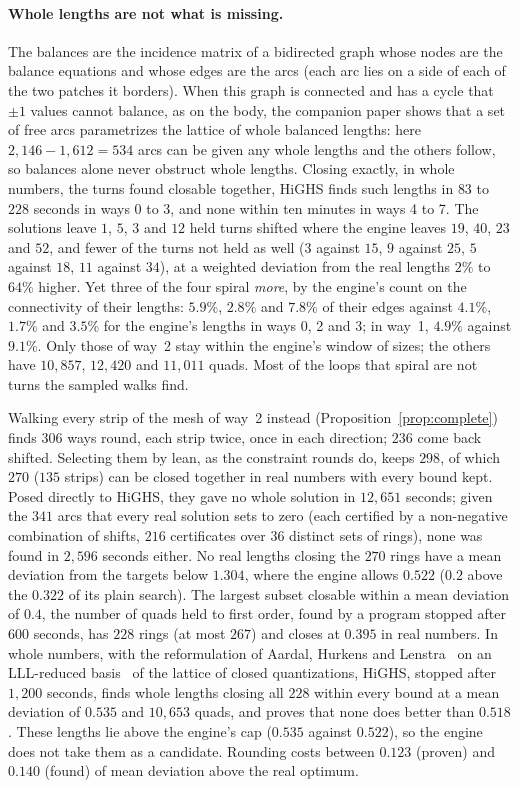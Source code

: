 \documentclass[11pt,a4paper]{article}
\begin{document}
\paragraph{Whole lengths are not what is missing.}
The balances are the incidence matrix of a bidirected graph whose nodes are
the balance equations and whose edges are the arcs (each arc lies on a side
of each of the two patches it borders). When this graph is connected and has
a cycle that $\pm1$ values cannot balance, as on the body, the companion
paper shows that a set of free arcs parametrizes the lattice of whole
balanced lengths: here $2{,}146 - 1{,}612 = 534$ arcs can be given any whole
lengths and the others follow, so balances alone never obstruct whole
lengths. Closing exactly, in whole numbers, the turns found closable
together, HiGHS finds such lengths in $83$ to $228$ seconds in ways 0 to 3,
and none within ten minutes in ways 4 to 7. The solutions leave $1$, $5$,
$3$ and $12$ held turns shifted where the engine leaves $19$, $40$, $23$ and
$52$, and fewer of the turns not held as well ($3$ against $15$, $9$ against
$25$, $5$ against $18$, $11$ against $34$), at a weighted deviation from the
real lengths $2\%$ to $64\%$ higher. Yet three of the four spiral
\emph{more}, by the engine's count on the connectivity of their lengths:
$5.9\%$, $2.8\%$ and $7.8\%$ of their edges against $4.1\%$, $1.7\%$ and
$3.5\%$ for the engine's lengths in ways 0, 2 and 3; in way~1, $4.9\%$
against $9.1\%$. Only those of way~2 stay within the engine's window of
sizes; the others have $10{,}857$, $12{,}420$ and $11{,}011$ quads. Most of
the loops that spiral are not turns the sampled walks find.

Walking every strip of the mesh of way~2 instead
(Proposition~\ref{prop:complete}) finds $306$ ways round, each strip twice,
once in each direction; $236$ come back shifted. Selecting them by lean, as
the constraint rounds do, keeps $298$, of which $270$ ($135$ strips) can be
closed together in real numbers with every bound kept. Posed directly to
HiGHS, they gave no whole solution in $12{,}651$ seconds; given the $341$
arcs that every real solution sets to zero (each certified by a non-negative
combination of shifts, $216$ certificates over $36$ distinct sets of rings),
none was found in $2{,}596$ seconds either. No real lengths closing the
$270$ rings have a mean deviation from the targets below $1.304$, where the
engine allows $0.522$ ($0.2$ above the $0.322$ of its plain search). The
largest subset closable within a mean deviation of $0.4$, the number of
quads held to first order, found by a program stopped after $600$ seconds,
has $228$ rings (at most $267$) and closes at $0.395$ in real numbers. In
whole numbers, with the reformulation of Aardal, Hurkens and
Lenstra~\cite{aardal2000diophantine} on an LLL-reduced
basis~\cite{lenstra1982lll} of the lattice of closed quantizations, HiGHS,
stopped after $1{,}200$ seconds, finds whole lengths closing all $228$
within every bound at a mean deviation of $0.535$ and $10{,}653$ quads, and
proves that none does better than $0.518$. These lengths lie above the
engine's cap ($0.535$ against $0.522$), so the engine does not take them as
a candidate. Rounding costs between $0.123$ (proven) and $0.140$ (found) of
mean deviation above the real optimum.
\end{document}
